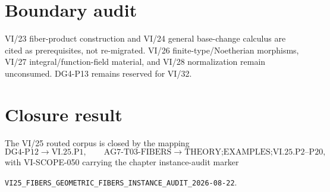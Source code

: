 \section*{Boundary audit}
VI/23 fiber-product construction and VI/24 general base-change calculus are cited as prerequisites,
not re-migrated.  VI/26 finite-type/Noetherian morphisms, VI/27 integral/function-field material, and
VI/28 normalization remain unconsumed.  DG4-P13 remains reserved for VI/32.

\section*{Closure result}
The VI/25 routed corpus is closed by the mapping
\[
\text{DG4-P12}\to\text{VI.25.P1},
\qquad
\text{AG7-T03-FIBERS}\to\text{THEORY;EXAMPLES;VI.25.P2--P20},
\]
with VI-SCOPE-050 carrying the chapter instance-audit marker\par\noindent\texttt{VI25\_FIBERS\_GEOMETRIC\_FIBERS\_INSTANCE\_AUDIT\_2026-08-22}.
